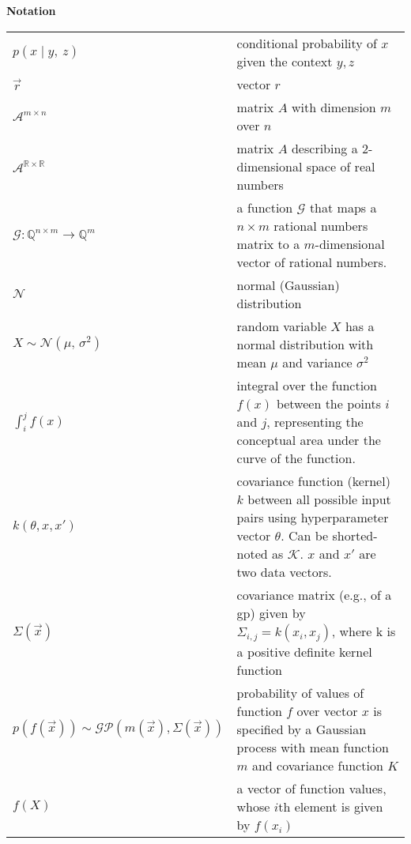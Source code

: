 \newpage
{}
\listoftables

\newpage
{}
\listoffigures

\newpage
{}
\vspace*{-3cm}
\listofmyequations

\newpage
{\Large \textbf{Notation}}\\[.3cm]
\begin{tabularx}{\linewidth}{l@{\quad}X}
	$p(x \mid y,\ z)$ & conditional probability of $x$ given the context ${y, z}$\\
	$\vec{r}$ & vector $r$ \\
	$\mathcal{A}^{m \times n}$ & matrix $A$ with dimension $m$ over $n$ \\
	$\mathcal{A}^{\mathbb{R} \times \mathbb{R}}$ & matrix $A$ describing a 2-dimensional space of real numbers \\
	$\mathcal{G}: \mathbb{Q}^{n \times m} \longrightarrow \mathbb{Q}^{m}$ & a function $\mathcal{G}$ that maps a $n \times m$ rational numbers matrix to a $m$-dimensional vector of rational numbers.\\
	$\mathcal{N}$ 	&	normal (Gaussian) distribution \\
	$X \sim \mathcal{N}(\mu,\,\sigma^{2})$	&	random variable $X$ has a normal distribution with mean $\mu$ and variance $\sigma^{2}$ \\
	$\int_{i}^{j}f(x)$ & integral over the function $f(x)$ between the points $i$ and $j$, representing the conceptual area under the curve of the function.\\
	$k\left( \theta, x, x' \right)$ & covariance function (kernel) $k$ between all possible input pairs using hyperparameter vector $\theta$. Can be shorted-noted as $\mathcal{K}$. $x$ and $x'$ are two data vectors. \\
	$\Sigma(\vec{x})$	&	covariance matrix (e.g., of a \acl{gp}) given by $\Sigma_{i,j} = k(x_i, x_j)$, where k is a positive definite kernel function \\
	$p\left( f \left( \vec{x} \right) \right) \sim \mathcal{GP}\left( m(\vec{x}), \Sigma(\vec{x}) \right)$	&	probability of values of function $f$ over vector $x$ is specified by a Gaussian process with mean function $m$ and covariance function $K$ \\
	$f(X)$	&	a vector of function values, whose $i$th element is given by $f(x_i)$ \\

\end{tabularx}
